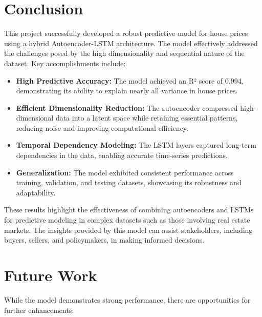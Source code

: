 \section{Conclusion}
This project successfully developed a robust predictive model for house prices using a hybrid Autoencoder-LSTM architecture. The model effectively addressed the challenges posed by the high dimensionality and sequential nature of the dataset. Key accomplishments include:

\begin{itemize}
    \item \textbf{High Predictive Accuracy:} The model achieved an R² score of 0.994, demonstrating its ability to explain nearly all variance in house prices.
    \item \textbf{Efficient Dimensionality Reduction:} The autoencoder compressed high-dimensional data into a latent space while retaining essential patterns, reducing noise and improving computational efficiency.
    \item \textbf{Temporal Dependency Modeling:} The LSTM layers captured long-term dependencies in the data, enabling accurate time-series predictions.
    \item \textbf{Generalization:} The model exhibited consistent performance across training, validation, and testing datasets, showcasing its robustness and adaptability.
\end{itemize}

These results highlight the effectiveness of combining autoencoders and LSTMs for predictive modeling in complex datasets such as those involving real estate markets. The insights provided by this model can assist stakeholders, including buyers, sellers, and policymakers, in making informed decisions.

\section{Future Work}
While the model demonstrates strong performance, there are opportunities for further enhancements:

